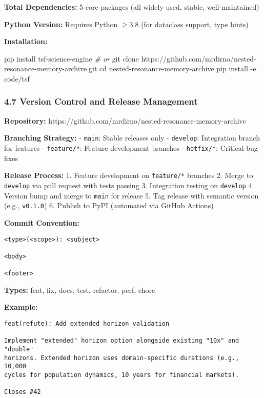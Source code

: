 \documentclass[
]{article}
\newenvironment{Shaded}{}{}
\newcommand{\AttributeTok}[1]{\textcolor[rgb]{0.49,0.56,0.16}{#1}}
\newcommand{\BuiltInTok}[1]{\textcolor[rgb]{0.00,0.50,0.00}{#1}}
\newcommand{\CommentTok}[1]{\textcolor[rgb]{0.38,0.63,0.69}{\textit{#1}}}
\newcommand{\ExtensionTok}[1]{#1}
\newcommand{\FunctionTok}[1]{\textcolor[rgb]{0.02,0.16,0.49}{#1}}
\newcommand{\NormalTok}[1]{#1}
\begin{document}
\textbf{Total Dependencies:} 5 core packages (all widely-used, stable,
well-maintained)

\textbf{Python Version:} Requires Python $\geq$3.8 (for dataclass support,
type hints)

\textbf{Installation:}

\begin{Shaded}
\begin{Highlighting}[]
\ExtensionTok{pip}\NormalTok{ install tsf{-}science{-}engine}
\CommentTok{\# or}
\FunctionTok{git}\NormalTok{ clone https://github.com/mrdirno/nested{-}resonance{-}memory{-}archive.git}
\BuiltInTok{cd}\NormalTok{ nested{-}resonance{-}memory{-}archive}
\ExtensionTok{pip}\NormalTok{ install }\AttributeTok{{-}e}\NormalTok{ code/tsf}
\end{Highlighting}
\end{Shaded}

\subsubsection{4.7 Version Control and Release
Management}\label{version-control-and-release-management}

\textbf{Repository:}
https://github.com/mrdirno/nested-resonance-memory-archive

\textbf{Branching Strategy:} - \texttt{main}: Stable releases only -
\texttt{develop}: Integration branch for features - \texttt{feature/*}:
Feature development branches - \texttt{hotfix/*}: Critical bug fixes

\textbf{Release Process:} 1. Feature development on \texttt{feature/*}
branches 2. Merge to \texttt{develop} via pull request with tests
passing 3. Integration testing on \texttt{develop} 4. Version bump and
merge to \texttt{main} for release 5. Tag release with semantic version
(e.g., \texttt{v0.1.0}) 6. Publish to PyPI (automated via GitHub
Actions)

\textbf{Commit Convention:}

\begin{verbatim}
<type>(<scope>): <subject>

<body>

<footer>
\end{verbatim}

\textbf{Types:} feat, fix, docs, test, refactor, perf, chore

\textbf{Example:}

\begin{verbatim}
feat(refute): Add extended horizon validation

Implement "extended" horizon option alongside existing "10x" and "double"
horizons. Extended horizon uses domain-specific durations (e.g., 10,000
cycles for population dynamics, 10 years for financial markets).

Closes #42
\end{verbatim}
\end{document}
